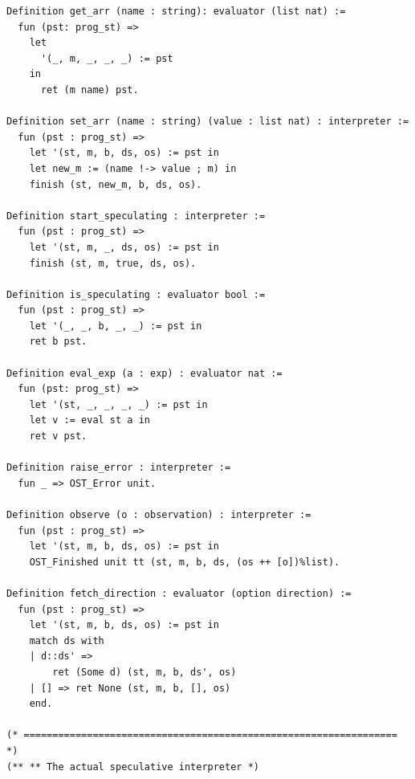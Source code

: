 \documentclass[12pt]{report}
\begin{document}
\begin{verbatim}
Definition get_arr (name : string): evaluator (list nat) :=
  fun (pst: prog_st) =>
    let
      '(_, m, _, _, _) := pst
    in
      ret (m name) pst.

Definition set_arr (name : string) (value : list nat) : interpreter :=
  fun (pst : prog_st) =>
    let '(st, m, b, ds, os) := pst in
    let new_m := (name !-> value ; m) in
    finish (st, new_m, b, ds, os).

Definition start_speculating : interpreter :=
  fun (pst : prog_st) =>
    let '(st, m, _, ds, os) := pst in
    finish (st, m, true, ds, os).

Definition is_speculating : evaluator bool :=
  fun (pst : prog_st) =>
    let '(_, _, b, _, _) := pst in
    ret b pst.

Definition eval_exp (a : exp) : evaluator nat :=
  fun (pst: prog_st) =>
    let '(st, _, _, _, _) := pst in
    let v := eval st a in
    ret v pst.

Definition raise_error : interpreter :=
  fun _ => OST_Error unit.

Definition observe (o : observation) : interpreter :=
  fun (pst : prog_st) =>
    let '(st, m, b, ds, os) := pst in
    OST_Finished unit tt (st, m, b, ds, (os ++ [o])%list).

Definition fetch_direction : evaluator (option direction) :=
  fun (pst : prog_st) =>
    let '(st, m, b, ds, os) := pst in
    match ds with
    | d::ds' =>
        ret (Some d) (st, m, b, ds', os)
    | [] => ret None (st, m, b, [], os)
    end.

(* ================================================================= *)
(** ** The actual speculative interpreter *)


\end{verbatim}
\end{document}
